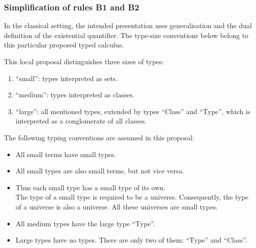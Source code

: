 \subsubsection{Simplification of rules B1 and B2}
In the classical setting, the intended presentation uses generalisation and
the dual definition of the existential quantifier. The type-size conventions
below belong to this particular proposed typed calculus.%
\begin{note}
This local proposal distinguishes three sizes of types:
\begin{enumerate}
\item ``small'': types interpreted as sets.
\item ``medium'': types interpreted as classes.
\item ``large'': all mentioned types, extended by types ``Class'' and ``Type'', which is interpreted as a conglomerate of all classes.
\end{enumerate}
\end{note}
\begin{note}[judgements]
The following typing conventions are assumed in this proposal:
\begin{itemize}
\item All small terms have small types.
\item All small types are also small terms, but not vice versa.
\item Thus each small type has a small type of its own.\\
The type of a small type is required to be a universe. Consequently, the type of a universe is also a universe. All these universes are small types.
\item All medium types have the large type ``Type''.
\item Large types have no types. There are only two of them: ``Type'' and ``Class''. 
\end{itemize}
\end{note}

